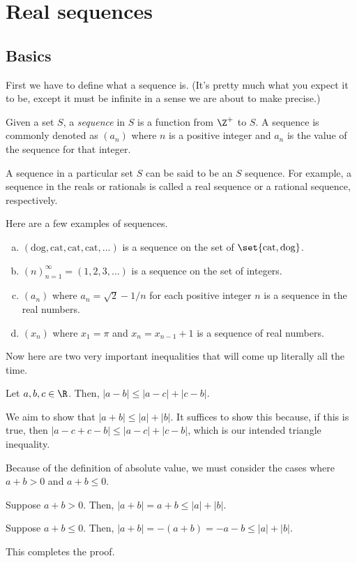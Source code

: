 \documentclass[class=article, crop=false]{standalone}
\begin{document}
\section{Real sequences}

\subsection{Basics}

First we have to define what a sequence is. (It's pretty much what you expect it to be, except it must be infinite in a sense we are about to make precise.)
\begin{defn}[Sequence]
    Given a set $S$, a \textit{sequence} in $S$ is a function from $\Z^+$ to $S$. A sequence is commonly denoted as $(a_n)$ where $n$ is a positive integer and $a_n$ is the value of the sequence for that integer.
\end{defn}
\begin{rem}
    A sequence in a particular set $S$ can be said to be an $S$ sequence. For example, a sequence in the reals or rationals is called a real sequence or a rational sequence, respectively.
\end{rem}
Here are a few examples of sequences.
\begin{ex}
    \begin{enumerate}[(a)]
        \item $(\text{dog}, \text{cat}, \text{cat}, \text{cat}, \ldots)$ is a sequence on the set of $\set{\text{cat}, \text{dog}}$.
        \item $(n)_{n=1}^\infty = (1,2,3,\ldots)$ is a sequence on the set of integers.
        \item $(a_n)$ where $a_n = \sqrt 2 - 1/n$ for each positive integer $n$ is a sequence in the real numbers.
        \item $(x_n)$ where $x_1 = \pi$ and $x_n = x_{n-1}+1$ is a sequence of real numbers.
    \end{enumerate}
\end{ex}

Now here are two very important inequalities that will come up literally all the time.
\begin{thm}
    Let $a,b,c \in \R$. Then, $|a-b| \leq |a-c| + |c-b|$.
\end{thm}
\begin{pf}
    We aim to show that $|a+b| \leq |a| + |b|$. It suffices to show this because, if this is true, then $|a-c + c-b| \leq |a-c| + |c-b|$, which is our intended triangle inequality.

    Because of the definition of absolute value, we must consider the cases where $a+b > 0$ and $a+b \leq 0$.

    Suppose $a+b > 0$. Then, $|a+b| = a+b \leq |a| + |b|$.

    Suppose $a+b \leq 0$. Then, $|a+b| = -(a+b) = -a -b \leq |a| + |b|$.

    This completes the proof.
\end{pf}
\end{document}
